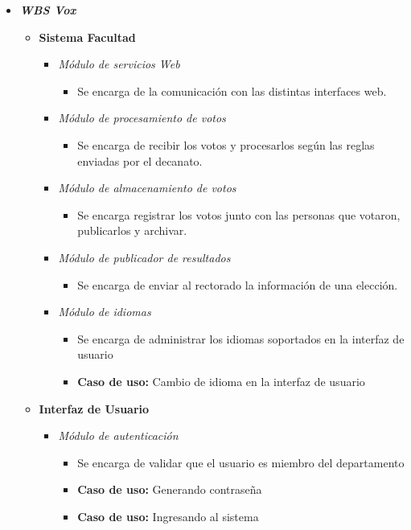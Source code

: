 \begin{itemize}
 \item {\bf \emph{WBS Vox}}
\begin{itemize}
 \item {\bf Sistema Facultad}
\begin{itemize}
 \item \emph{M\'odulo de servicios Web} 
\begin{itemize}
 \item Se encarga de la comunicación con las distintas interfaces web.
\end{itemize}
 \item \emph{M\'odulo de procesamiento de votos} 
\begin{itemize}
 \item Se encarga de recibir los votos y procesarlos según las reglas enviadas por el decanato.
\end{itemize}
 \item \emph{M\'odulo de almacenamiento de votos} 
\begin{itemize}
 \item Se encarga registrar los votos junto con las personas que votaron, publicarlos y archivar.
\end{itemize}
 \item \emph{M\'odulo de publicador de resultados} 
\begin{itemize}
 \item Se encarga de enviar al rectorado la información de una elección.
\end{itemize}
 \item \emph{M\'odulo de idiomas}
\begin{itemize}
 \item Se encarga de administrar los idiomas soportados en la interfaz de usuario
 \item {\bf Caso de uso:} Cambio de idioma en la interfaz de usuario
\end{itemize}
\end{itemize}
 \item {\bf Interfaz de Usuario}
\begin{itemize}
 \item \emph{M\'odulo de autenticación}
\begin{itemize}
 \item Se encarga de validar que el usuario es miembro del departamento
 \item {\bf Caso de uso:} Generando contrase\~na
 \item {\bf Caso de uso:} Ingresando al sistema

\end{itemize}
\end{itemize}
\end{itemize}
\end{itemize}
